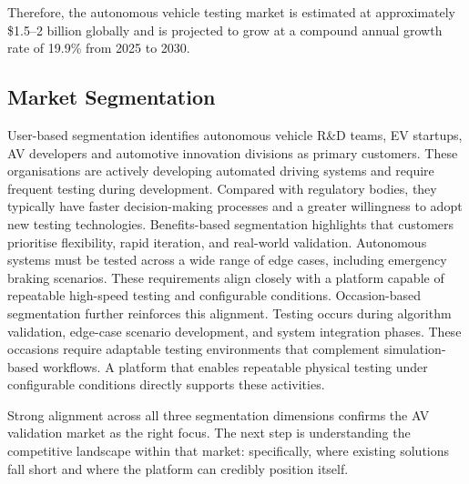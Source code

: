 \documentclass[11pt, a4paper]{report}
\numberwithin{equation}{section}
\begin{document}
\begin{refsection}
Therefore, the autonomous vehicle testing market is estimated at approximately \$1.5--2 billion globally and is projected to grow at a compound annual growth rate of 19.9\% {\cite{grandview_autonomous_market}} from 2025 to 2030. 


\subsection{Market Segmentation}
\label{sec:ch6-av-market-segmentation}
User-based segmentation identifies autonomous vehicle R\&D teams, EV startups, AV developers and automotive innovation divisions as primary customers. These organisations are actively developing automated driving systems and require frequent testing during development. Compared with regulatory bodies, they typically have faster decision-making processes and a greater willingness to adopt new testing technologies.
Benefits-based segmentation highlights that customers prioritise flexibility, rapid iteration, and real-world validation. Autonomous systems must be tested across a wide range of edge cases, including emergency braking scenarios. These requirements align closely with a platform capable of repeatable high-speed testing and configurable conditions.
Occasion-based segmentation further reinforces this alignment. Testing occurs during algorithm validation, edge-case scenario development, and system integration phases. These occasions require adaptable testing environments that complement simulation-based workflows. A platform that enables repeatable physical testing under configurable conditions directly supports these activities.

Strong alignment across all three segmentation dimensions confirms the AV validation market as the right focus. The next step is understanding the competitive landscape within that market: specifically, where existing solutions fall short and where the platform can credibly position itself.


\end{refsection}
\end{document}
